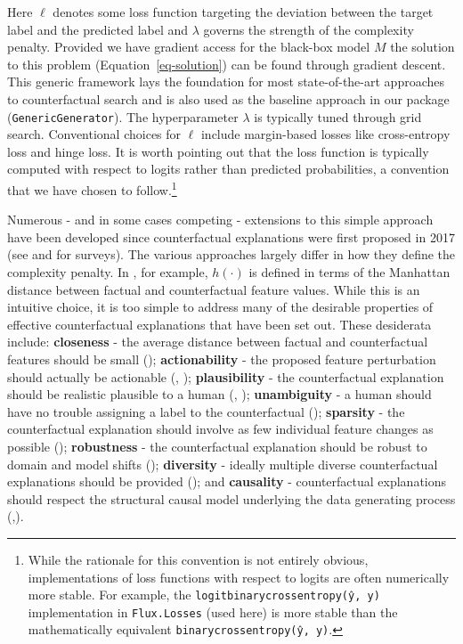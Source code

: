\documentclass[
  letterpaper,
  DIV=11,
  numbers=noendperiod]{scrartcl}
\begin{document}
Here \(\ell\) denotes some loss function targeting the deviation between
the target label and the predicted label and \(\lambda\) governs the
strength of the complexity penalty. Provided we have gradient access for
the black-box model \(M\) the solution to this problem
(Equation~\ref{eq-solution}) can be found through gradient descent. This
generic framework lays the foundation for most state-of-the-art
approaches to counterfactual search and is also used as the baseline
approach in our package (\texttt{GenericGenerator}). The hyperparameter
\(\lambda\) is typically tuned through grid search. Conventional choices
for \(\ell\) include margin-based losses like cross-entropy loss and
hinge loss. It is worth pointing out that the loss function is typically
computed with respect to logits rather than predicted probabilities, a
convention that we have chosen to follow.\footnote{While the rationale
  for this convention is not entirely obvious, implementations of loss
  functions with respect to logits are often numerically more stable.
  For example, the \texttt{logitbinarycrossentropy(ŷ,\ y)}
  implementation in \texttt{Flux.Losses} (used here) is more stable than
  the mathematically equivalent \texttt{binarycrossentropy(ŷ,\ y)}.}

Numerous - and in some cases competing - extensions to this simple
approach have been developed since counterfactual explanations were
first proposed in 2017 (see \cite{verma2020counterfactual} and
\cite{karimi2020survey} for surveys). The various approaches largely
differ in how they define the complexity penalty. In
\cite{wachter2017counterfactual}, for example, \(h(\cdot)\) is defined
in terms of the Manhattan distance between factual and counterfactual
feature values. While this is an intuitive choice, it is too simple to
address many of the desirable properties of effective counterfactual
explanations that have been set out. These desiderata include:
\textbf{closeness} - the average distance between factual and
counterfactual features should be small
(\cite{wachter2017counterfactual}); \textbf{actionability} - the
proposed feature perturbation should actually be actionable
(\cite{ustun2019actionable}, \cite{poyiadzi2020face});
\textbf{plausibility} - the counterfactual explanation should be
realistic plausible to a human (\cite{joshi2019towards},
\cite{schut2021generating}); \textbf{unambiguity} - a human should have
no trouble assigning a label to the counterfactual
(\cite{schut2021generating}); \textbf{sparsity} - the counterfactual
explanation should involve as few individual feature changes as possible
(\cite{schut2021generating}); \textbf{robustness} - the counterfactual
explanation should be robust to domain and model shifts
(\cite{upadhyay2021towards}); \textbf{diversity} - ideally multiple
diverse counterfactual explanations should be provided
(\cite{mothilal2020explaining}); and \textbf{causality} - counterfactual
explanations should respect the structural causal model underlying the
data generating process
(\cite{karimi2020algorithmic},\cite{karimi2021algorithmic}).
\end{document}
